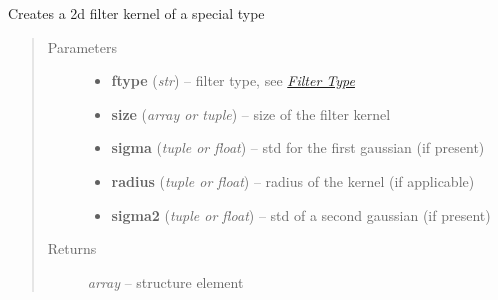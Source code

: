 \documentclass[letterpaper,10pt,english]{sphinxmanual}
\begin{document}

\begin{fulllineitems}
\label{api/ClearMap.ImageProcessing.Filter:ClearMap.ImageProcessing.Filter.FilterKernel.filterKernel2D}
Creates a 2d filter kernel of a special type
\begin{quote}\begin{description}
\item[{Parameters}] \leavevmode\begin{itemize}
\item {} 
\textbf{ftype} (\emph{str}) --
filter type, see {\hyperref[api/ClearMap.ImageProcessing.Filter:filtertypes]{\emph{Filter Type}}}

\item {} 
\textbf{size} (\emph{array or tuple}) --
size of the filter kernel

\item {} 
\textbf{sigma} (\emph{tuple or float}) --
std for the first gaussian (if present)

\item {} 
\textbf{radius} (\emph{tuple or float}) --
radius of the kernel (if applicable)

\item {} 
\textbf{sigma2} (\emph{tuple or float}) --
std of a second gaussian (if present)

\end{itemize}

\item[{Returns}] \leavevmode
\emph{array} --
structure element

\end{description}\end{quote}

\end{fulllineitems}

\end{document}
